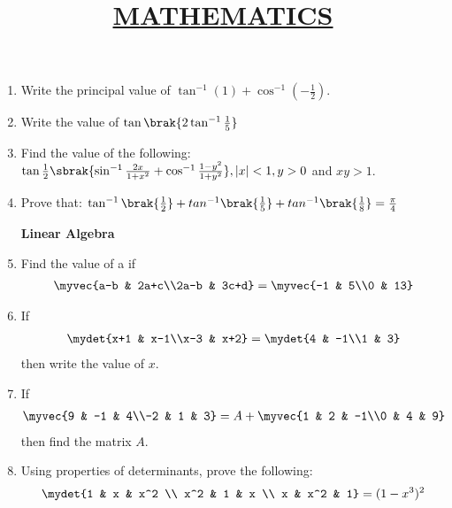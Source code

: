 \documentclass{article}
\title{\underline{\textbf{MATHEMATICS}}}
\date{}
\begin{document}
\maketitle
\begin{enumerate}
		
		\centerline{\textbf{Trigonometry}}

	\item Write the principal value of $\tan^{-1} (1)+\cos^{-1} (-\frac{1}{2})$.
					
	\item Write the value of $\tan \brak{2 \tan^{-1} \frac{1}{5}}$
	
	\item Find the value of the following: $\tan\frac{1}{2}\sbrak{\sin^{-1}\frac{2x}{1+x^{2}}+\cos^{-1}\frac{1-y^2}{1+y^2}},|x|<1,y>0$ and $xy>1$.

	\item Prove that: $\tan^{-1}\brak{\frac{1}{2}}+tan^{-1}\brak{\frac{1}{5}}+tan^{-1}\brak{\frac{1}{8}}=\frac{\pi}{4}$\\

		\centerline{\textbf{Linear Algebra}}

	\item Find the value of a if 
		\begin{align}
			\myvec{a-b & 2a+c\\2a-b & 3c+d}=\myvec{-1 & 5\\0 & 13}\nonumber
	        \end{align}

        \item If \begin{align}
			\mydet{x+1 & x-1\\x-3 & x+2}
	                 =
	                \mydet{4 & -1\\1 & 3}\nonumber
	          \end{align} then write the value of $x$.

	\item If \begin{align}
			\myvec{9 & -1 & 4\\-2 & 1 & 3}=A+\myvec{1 & 2 & -1\\0 & 4 & 9}\nonumber
	         \end{align} then find the matrix $A$.
	
	 \item Using properties of determinants, prove the following:
		\begin{align}
			\mydet{1 & x & x^2 \\ x^2 & 1 & x \\ x & x^2 & 1}=(1-x^3)^2 \nonumber
		\end{align}


\end{enumerate}
\end{document}
